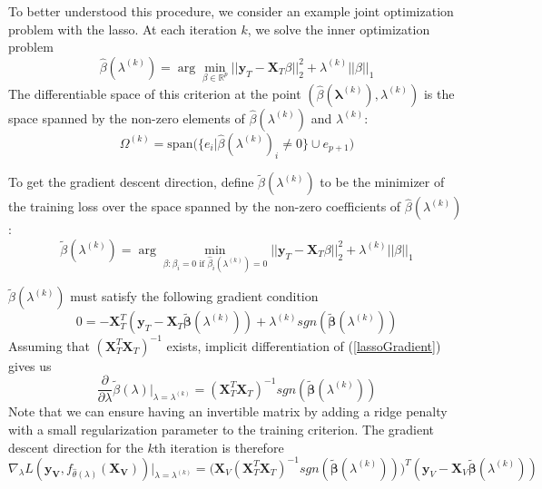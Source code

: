\documentclass[10pt,letterpaper]{article}
\begin{document}
To better understood this procedure, we consider an example joint optimization problem with the lasso. At each iteration $k$, we solve the inner optimization problem
\begin{equation}
\hat \beta(\lambda^{(k)}) = \arg \min_{\beta \in \mathbb{R}^p} ||\boldsymbol{y}_T - \boldsymbol{X}_T \beta||^2_2 + \lambda^{(k)} ||\beta||_1
\label{lassoinner}
\end{equation}
The differentiable space of this criterion at the point $(\hat \beta(\boldsymbol{\lambda}^{(k)}), \lambda^{(k)})$ is the space spanned by the non-zero elements of $\hat \beta(\lambda^{(k)})$ and $\lambda^{(k)}$:
\begin{equation}
\Omega^{(k)} = \text{span} \Big ( \{ e_i | \hat \beta(\lambda^{(k)})_i \ne 0 \} \cup e_{p+1} \Big )
\end{equation}

To get the gradient descent direction, define $\tilde \beta(\lambda^{(k)})$ to be the minimizer of the training loss over the space spanned by the non-zero coefficients of $\hat \beta(\lambda^{(k)})$:
\begin{equation}
\tilde \beta(\lambda^{(k)}) = \arg \min_{\beta: \beta_i = 0 \text{ if } \hat \beta_i(\lambda^{(k)}) = 0 } ||\boldsymbol{y}_T - \boldsymbol{X}_T \beta||^2_2 + \lambda^{(k)} ||\beta||_1
\end{equation}

$\tilde \beta(\lambda^{(k)})$ must satisfy the following gradient condition
\begin{equation}
0 = -\boldsymbol{X}_T^T(\boldsymbol{y}_T
- \boldsymbol{X}_T \tilde{\boldsymbol{\beta}} (\lambda^{(k)}) )
+ \lambda^{(k)} sgn(\tilde{\boldsymbol{\beta}} (\lambda^{(k)}))
\label{lassoGradient}
\end{equation}
Assuming that $(\boldsymbol{X}_T^T\boldsymbol{X}_T)^{-1} $ exists, implicit differentiation of (\ref{lassoGradient}) gives us
\begin{equation}
\frac{\partial}{\partial \lambda} \tilde \beta(\lambda) \big |_{\lambda = \lambda^{(k)}} = (\boldsymbol{X}_T^T\boldsymbol{X}_T)^{-1} sgn(\tilde{\boldsymbol{\beta}} (\lambda^{(k)}))
\end{equation}
Note that we can ensure having an invertible matrix by adding a ridge penalty with a small regularization parameter to the training criterion.
The gradient descent direction for the $k$th iteration is therefore
\begin{equation}
\nabla_{\lambda} L(\boldsymbol{y_V}, f_{\hat \theta(\lambda)}(\boldsymbol{X_V})) |_{\lambda = \lambda^{(k)}} =
\big (\boldsymbol{X}_V(\boldsymbol{X}_T^T\boldsymbol{X}_T)^{-1} sgn(\tilde{\boldsymbol{\beta}} (\lambda^{(k)})) \big )^T
(\boldsymbol{y}_V - \boldsymbol{X}_V \tilde{\boldsymbol{\beta}} (\lambda^{(k)}))
\end{equation}
\end{document}
